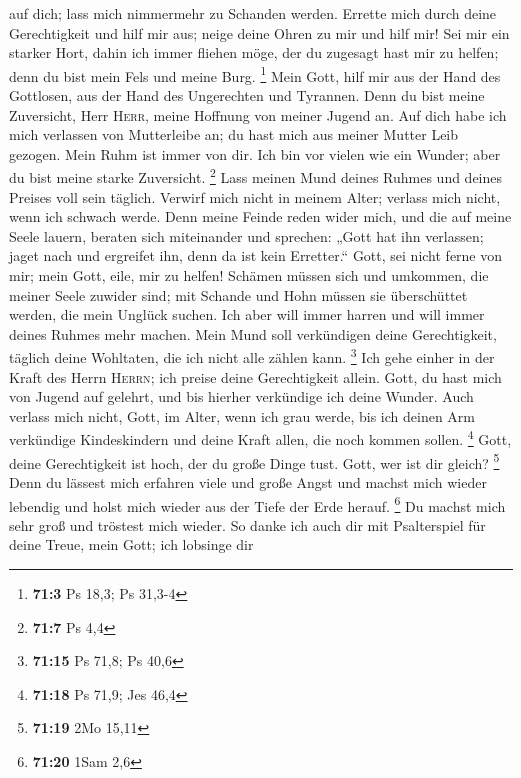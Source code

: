 auf dich; lass mich nimmermehr zu Schanden werden. 
Errette mich durch deine Gerechtigkeit und hilf mir aus; neige deine
Ohren zu mir und hilf mir!  Sei mir ein starker Hort,
dahin ich immer fliehen möge, der du zugesagt hast mir zu helfen; denn
du bist mein Fels und meine Burg. \footnote{\textbf{71:3} Ps 18,3; Ps
  31,3-4}  Mein Gott, hilf mir aus der Hand des Gottlosen,
aus der Hand des Ungerechten und Tyrannen.  Denn du bist
meine Zuversicht, Herr \textsc{Herr}, meine Hoffnung von meiner Jugend
an.  Auf dich habe ich mich verlassen von Mutterleibe an;
du hast mich aus meiner Mutter Leib gezogen. Mein Ruhm ist immer von
dir.  Ich bin vor vielen wie ein Wunder; aber du bist
meine starke Zuversicht. \footnote{\textbf{71:7} Ps 4,4} 
Lass meinen Mund deines Ruhmes und deines Preises voll sein täglich.
 Verwirf mich nicht in meinem Alter; verlass mich nicht,
wenn ich schwach werde.  Denn meine Feinde reden wider
mich, und die auf meine Seele lauern, beraten sich miteinander
 und sprechen: „Gott hat ihn verlassen; jaget nach und
ergreifet ihn, denn da ist kein Erretter.``  Gott, sei
nicht ferne von mir; mein Gott, eile, mir zu helfen! 
Schämen müssen sich und umkommen, die meiner Seele zuwider sind; mit
Schande und Hohn müssen sie überschüttet werden, die mein Unglück
suchen.  Ich aber will immer harren und will immer deines
Ruhmes mehr machen.  Mein Mund soll verkündigen deine
Gerechtigkeit, täglich deine Wohltaten, die ich nicht alle zählen kann.
\footnote{\textbf{71:15} Ps 71,8; Ps 40,6}  Ich gehe
einher in der Kraft des Herrn \textsc{Herrn}; ich preise deine
Gerechtigkeit allein.  Gott, du hast mich von Jugend auf
gelehrt, und bis hierher verkündige ich deine Wunder. 
Auch verlass mich nicht, Gott, im Alter, wenn ich grau werde, bis ich
deinen Arm verkündige Kindeskindern und deine Kraft allen, die noch
kommen sollen. \footnote{\textbf{71:18} Ps 71,9; Jes 46,4}
 Gott, deine Gerechtigkeit ist hoch, der du große Dinge
tust. Gott, wer ist dir gleich? \footnote{\textbf{71:19} 2Mo 15,11}
 Denn du lässest mich erfahren viele und große Angst und
machst mich wieder lebendig und holst mich wieder aus der Tiefe der Erde
herauf. \footnote{\textbf{71:20} 1Sam 2,6}  Du machst
mich sehr groß und tröstest mich wieder.  So danke ich
auch dir mit Psalterspiel für deine Treue, mein Gott; ich lobsinge dir
